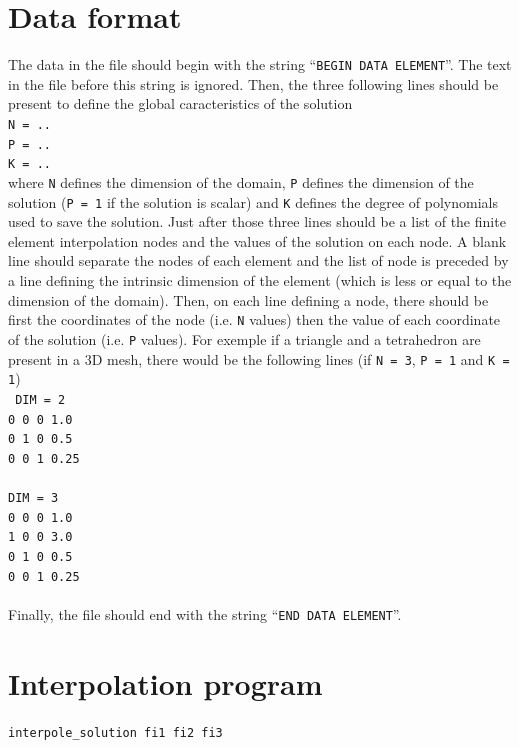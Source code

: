 \documentclass[11pt,a4paper]{article}
\begin{document}
\newpage

\section{Data format}
The data in the file should begin with the string ``{\tt BEGIN DATA ELEMENT}''. The text in the file before this string is ignored. Then, the three following lines should be present to define the global caracteristics of the solution\\[0.5cm]
{\tt N = ..\\
  P = ..\\
  K = ..\\
}
where {\tt N} defines the dimension of the domain, {\tt P} defines the dimension of the solution ({\tt P = 1} if the solution is scalar) and {\tt K} defines the degree of polynomials used to save the solution. Just after those three lines should be a list of the finite element interpolation nodes and the values of the solution on each node. A blank line should separate the nodes of each element and the list of node is preceded by a line defining the intrinsic dimension of the element (which is less or equal to the dimension of the domain). Then, on each line defining a node, there should be first the coordinates of the node (i.e. {\tt N} values) then the value of each coordinate of the solution (i.e. {\tt P} values). For exemple if a triangle and a tetrahedron are present in a 3D mesh, there would be the following lines (if {\tt N = 3}, {\tt P = 1} and {\tt K = 1})\\[0.5cm]
{\tt 
  DIM = 2 \\
  0 0 0 1.0 \\
  0 1 0 0.5 \\
  0 0 1 0.25 \\
  \\
  DIM = 3 \\
  0 0 0 1.0 \\
  1 0 0 3.0 \\
  0 1 0 0.5 \\
  0 0 1 0.25 \\
  \\
}
Finally, the file should end with the string ``{\tt END DATA ELEMENT}''.

\section{Interpolation program}

{\tt interpole\_solution fi1 fi2 fi3} \\[0.5cm]
\end{document}
